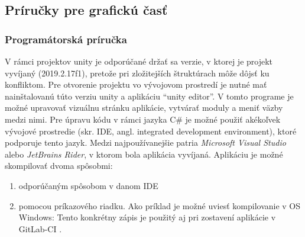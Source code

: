 \subsection{Príručky pre grafickú časť}\label{subsec:helpers-graphics}

\subsubsection{Programátorská príručka}
V rámci projektov unity je odporúčané držať sa verzie, v ktorej je projekt vyvíjaný (2019.2.17f1), pretože pri
zložitejších štruktúrach môže dôjsť ku konfliktom.
Pre otvorenie projektu vo vývojovom prostredí je nutné mať nainštalovanú túto verziu unity a aplikáciu
\enquote{unity editor}.
V tomto programe je možné upravovať vizuálnu stránku aplikácie, vytvárať moduly a meniť väzby medzi nimi.
Pre úpravu kódu v rámci jazyka C\# je možné použiť akékoľvek vývojové prostredie (skr. IDE, angl. integrated development
environment), ktoré podporuje tento jazyk.
Medzi najpoužívanejšie patria \emph{Microsoft Visual Studio} alebo \emph{JetBrains Rider}, v ktorom bola aplikácia
vyvíjaná.
Aplikáciu je možné skompilovať dvoma spôsobmi:
\begin{enumerate}
    \item odporúčaným spôsobom v danom IDE
    \item pomocou príkazového riadku.
    Ako príklad je možné uviesť kompilovanie v OS Windows:
    Tento konkrétny zápis je použitý aj pri zostavení aplikácie v GitLab-CI .
\end{enumerate}

